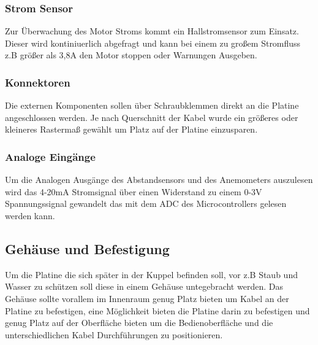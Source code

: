 \subsubsection{Strom Sensor}
Zur Überwachung des Motor Stroms kommt ein Hallstromsensor zum Einsatz. Dieser wird kontiniuerlich abgefragt und kann bei einem zu großem Stromfluss z.B größer als 3,8A den Motor stoppen oder Warnungen Ausgeben.
\subsubsection{Konnektoren}
Die externen Komponenten sollen über Schraubklemmen direkt an die Platine angeschlossen werden. Je nach Querschnitt der Kabel wurde ein größeres oder kleineres Rastermaß gewählt um Platz auf der Platine einzusparen.
\subsubsection{Analoge Eingänge}
Um die Analogen Ausgänge des Abstandsensors und des Anemometers auszulesen wird das 4-20mA Stromsignal über einen Widerstand zu einem 0-3V Spannungssignal gewandelt das mit dem \ac{ADC} des Microcontrollers gelesen werden kann.
\subsection{Gehäuse und Befestigung}
Um die Platine die sich später in der Kuppel befinden soll, vor z.B Staub und Wasser zu schützen soll diese in einem Gehäuse untegebracht werden. Das Gehäuse sollte vorallem im Innenraum genug Platz bieten um Kabel an der Platine zu befestigen, eine Möglichkeit bieten die Platine darin zu befestigen und genug Platz auf der Oberfläche bieten um die Bedienoberfläche und die unterschiedlichen Kabel Durchführungen zu positionieren.

